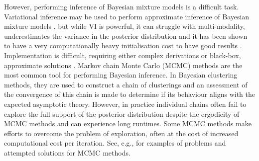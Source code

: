 \documentclass{bmcart}
\begin{document}



However, performing inference of Bayesian mixture models is a difficult task. Variational inference \citep[\textbf{VI},][]{blei2006variational} may be used to perform approximate inference of Bayesian mixture models \citep{martin2020computing}, but
while VI is powerful, it can struggle with multi-modality, underestimates the variance in the posterior distribution \citep{two2011turner} and it has been shown to have a very computationally heavy initialisation cost to have good results \citep{wang2011fast}. Implementation is difficult, requiring either complex derivations \citep[see the Appendix Supplementary Methods of][for an example]{argelaguet2018multi} or black-box, approximate solutions \citep{kucukelbir2017automatic}.
Markov chain Monte Carlo (MCMC) methods are the most common tool for performing Bayesian inference. In Bayesian clustering methods, they are used to construct a chain of clusterings and an assessment of the convergence of this chain is made to determine if its behaviour aligns with the expected asymptotic theory. However, in practice individual chains often fail to explore the full support of the posterior distribution despite the ergodicity of MCMC methods \citep[see, e.g., the Supplementary Materials of][]{strauss2020gpseudoclust} and can experience long runtimes. Some MCMC methods make efforts to overcome the problem of exploration, often at the cost of increased computational cost per iteration. See, e.g., \cite{robert2018accelerating, yao2020stacking} for examples of problems and attempted solutions for MCMC methods.
\end{document}
